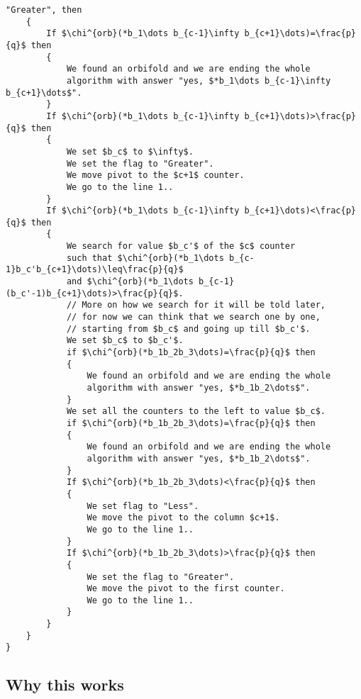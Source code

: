 \begin{lstlisting}[firstnumber=1,consecutivenumbers=true]
    "Greater", then
    {
        If $\chi^{orb}(*b_1\dots b_{c-1}\infty b_{c+1}\dots)=\frac{p}{q}$ then
        {
            We found an orbifold and we are ending the whole
            algorithm with answer "yes, $*b_1\dots b_{c-1}\infty b_{c+1}\dots$".
        } 
        If $\chi^{orb}(*b_1\dots b_{c-1}\infty b_{c+1}\dots)>\frac{p}{q}$ then
        {
            We set $b_c$ to $\infty$.
            We set the flag to "Greater".
            We move pivot to the $c+1$ counter.
            We go to the line 1..
        }  
        If $\chi^{orb}(*b_1\dots b_{c-1}\infty b_{c+1}\dots)<\frac{p}{q}$ then
        {
            We search for value $b_c'$ of the $c$ counter 
            such that $\chi^{orb}(*b_1\dots b_{c-1}b_c'b_{c+1}\dots)\leq\frac{p}{q}$ 
            and $\chi^{orb}(*b_1\dots b_{c-1}(b_c'-1)b_{c+1}\dots)>\frac{p}{q}$.
            // More on how we search for it will be told later, 
            // for now we can think that we search one by one,
            // starting from $b_c$ and going up till $b_c'$.
            We set $b_c$ to $b_c'$.
            if $\chi^{orb}(*b_1b_2b_3\dots)=\frac{p}{q}$ then 
            {
                We found an orbifold and we are ending the whole
                algorithm with answer "yes, $*b_1b_2\dots$".
            }
            We set all the counters to the left to value $b_c$.
            if $\chi^{orb}(*b_1b_2b_3\dots)=\frac{p}{q}$ then 
            {
                We found an orbifold and we are ending the whole
                algorithm with answer "yes, $*b_1b_2\dots$".
            }
            If $\chi^{orb}(*b_1b_2b_3\dots)<\frac{p}{q}$ then 
            {
                We set flag to "Less".
                We move the pivot to the column $c+1$.
                We go to the line 1..
            }
            If $\chi^{orb}(*b_1b_2b_3\dots)>\frac{p}{q}$ then 
            {
                We set the flag to "Greater".
                We move the pivot to the first counter.
                We go to the line 1..
            }
        }  
    }
}
\end{lstlisting}
\subsection{Why this works}

